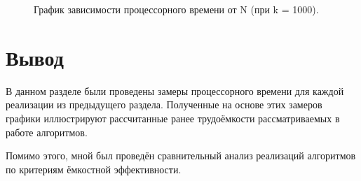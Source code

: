 \begin{figure}[!htbp]
	\centering
	\caption{График зависимости процессорного времени от N (при k = 1000).}
\end{figure}

\section*{Вывод}

В данном разделе были проведены замеры процессорного времени для каждой реализации из предыдущего раздела. Полученные на основе этих замеров графики иллюстрируют рассчитанные ранее трудоёмкости рассматриваемых в работе алгоритмов.

Помимо этого, мной был проведён сравнительный анализ реализаций алгоритмов по критериям ёмкостной эффективности.

\clearpage
